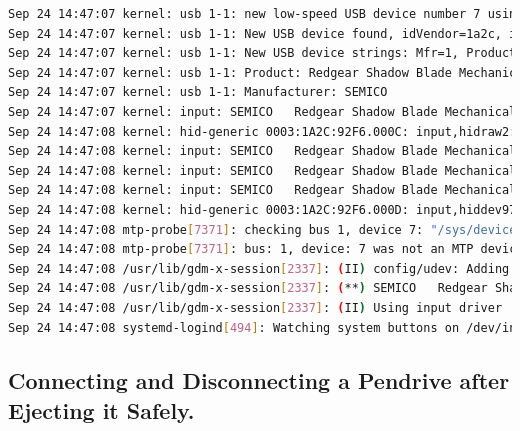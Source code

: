 \documentclass[11pt]{article}
\begin{document}
\begin{lstlisting}[language=bash]
Sep 24 14:47:07 kernel: usb 1-1: new low-speed USB device number 7 using xhci_hcd
Sep 24 14:47:07 kernel: usb 1-1: New USB device found, idVendor=1a2c, idProduct=92f6, bcdDevice= 1.16
Sep 24 14:47:07 kernel: usb 1-1: New USB device strings: Mfr=1, Product=2, SerialNumber=0
Sep 24 14:47:07 kernel: usb 1-1: Product: Redgear Shadow Blade Mechanical Keyboard
Sep 24 14:47:07 kernel: usb 1-1: Manufacturer: SEMICO  
Sep 24 14:47:07 kernel: input: SEMICO   Redgear Shadow Blade Mechanical Keyboard as /devices/pci0000:00/0000:00:14.0/usb1/1-1/1-1:1.0/0003:1A2C:92F6.000C/input/input32
Sep 24 14:47:08 kernel: hid-generic 0003:1A2C:92F6.000C: input,hidraw2: USB HID v1.10 Keyboard [SEMICO   Redgear Shadow Blade Mechanical Keyboard] on usb-0000:00:14.0-1/input0
Sep 24 14:47:08 kernel: input: SEMICO   Redgear Shadow Blade Mechanical Keyboard Consumer Control as /devices/pci0000:00/0000:00:14.0/usb1/1-1/1-1:1.1/0003:1A2C:92F6.000D/input/input33
Sep 24 14:47:08 kernel: input: SEMICO   Redgear Shadow Blade Mechanical Keyboard System Control as /devices/pci0000:00/0000:00:14.0/usb1/1-1/1-1:1.1/0003:1A2C:92F6.000D/input/input34
Sep 24 14:47:08 kernel: input: SEMICO   Redgear Shadow Blade Mechanical Keyboard as /devices/pci0000:00/0000:00:14.0/usb1/1-1/1-1:1.1/0003:1A2C:92F6.000D/input/input36
Sep 24 14:47:08 kernel: hid-generic 0003:1A2C:92F6.000D: input,hiddev97,hidraw3: USB HID v1.10 Keyboard [SEMICO   Redgear Shadow Blade Mechanical Keyboard] on usb-0000:00:14.0-1/input1
Sep 24 14:47:08 mtp-probe[7371]: checking bus 1, device 7: "/sys/devices/pci0000:00/0000:00:14.0/usb1/1-1"
Sep 24 14:47:08 mtp-probe[7371]: bus: 1, device: 7 was not an MTP device
Sep 24 14:47:08 /usr/lib/gdm-x-session[2337]: (II) config/udev: Adding input device SEMICO   Redgear Shadow Blade Mechanical Keyboard (/dev/input/event4)
Sep 24 14:47:08 /usr/lib/gdm-x-session[2337]: (**) SEMICO   Redgear Shadow Blade Mechanical Keyboard: Applying InputClass "libinput keyboard catchall"
Sep 24 14:47:08 /usr/lib/gdm-x-session[2337]: (II) Using input driver 'libinput' for 'SEMICO   Redgear Shadow Blade Mechanical Keyboard'
Sep 24 14:47:08 systemd-logind[494]: Watching system buttons on /dev/input/event4 (SEMICO   Redgear Shadow Blade Mechanical Keyboard)
\end{lstlisting}
\subsection{Connecting and Disconnecting a Pendrive after Ejecting it Safely. }
\end{document}
